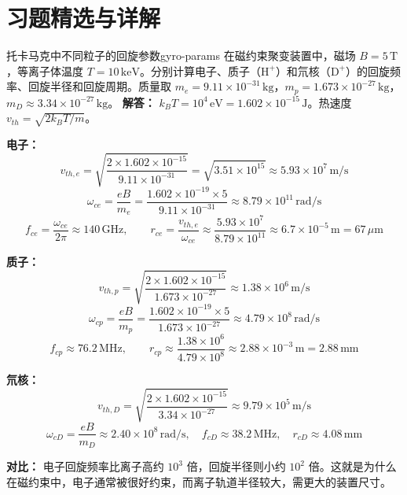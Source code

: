 ﻿%

\section*{习题精选与详解}

\begin{example}{托卡马克中不同粒子的回旋参数}{gyro-params}
在磁约束聚变装置中，磁场 $B=5\,\mathrm{T}$，等离子体温度 $T=10\,\mathrm{keV}$。分别计算电子、质子（$\mathrm{H}^+$）和氘核（$\mathrm{D}^+$）的回旋频率、回旋半径和回旋周期。质量取 $m_e=9.11\times 10^{-31}\,\mathrm{kg}$，$m_p=1.673\times 10^{-27}\,\mathrm{kg}$，$m_D\approx 3.34\times 10^{-27}\,\mathrm{kg}$。
\tcblower
\textbf{解答：}
$k_{\!B}T = 10^4\,\mathrm{eV} = 1.602\times 10^{-15}\,\mathrm{J}$。热速度 $v_{th}=\sqrt{2k_{\!B}T/m}$。

\textbf{电子：}
\[
v_{th,e} = \sqrt{\frac{2\times 1.602\times 10^{-15}}{9.11\times 10^{-31}}} = \sqrt{3.51\times 10^{15}} \approx 5.93\times 10^{7}\,\mathrm{m/s}
\]
\[
\omega_{ce} = \frac{eB}{m_e} = \frac{1.602\times 10^{-19}\times 5}{9.11\times 10^{-31}} \approx 8.79\times 10^{11}\,\mathrm{rad/s}
\]
\[
f_{ce} = \frac{\omega_{ce}}{2\pi} \approx 140\,\mathrm{GHz},\qquad r_{ce} = \frac{v_{th,e}}{\omega_{ce}} \approx \frac{5.93\times 10^{7}}{8.79\times 10^{11}} \approx 6.7\times 10^{-5}\,\mathrm{m} = 67\,\mu\mathrm{m}
\]

\textbf{质子：}
\[
v_{th,p} = \sqrt{\frac{2\times 1.602\times 10^{-15}}{1.673\times 10^{-27}}} \approx 1.38\times 10^{6}\,\mathrm{m/s}
\]
\[
\omega_{cp} = \frac{eB}{m_p} = \frac{1.602\times 10^{-19}\times 5}{1.673\times 10^{-27}} \approx 4.79\times 10^{8}\,\mathrm{rad/s}
\]
\[
f_{cp} \approx 76.2\,\mathrm{MHz},\qquad r_{cp} \approx \frac{1.38\times 10^{6}}{4.79\times 10^{8}} \approx 2.88\times 10^{-3}\,\mathrm{m} = 2.88\,\mathrm{mm}
\]

\textbf{氘核：}
\[
v_{th,D} = \sqrt{\frac{2\times 1.602\times 10^{-15}}{3.34\times 10^{-27}}} \approx 9.79\times 10^{5}\,\mathrm{m/s}
\]
\[
\omega_{cD} = \frac{eB}{m_D} \approx 2.40\times 10^{8}\,\mathrm{rad/s},\quad f_{cD}\approx 38.2\,\mathrm{MHz},\quad r_{cD}\approx 4.08\,\mathrm{mm}
\]

\textbf{对比：} 电子回旋频率比离子高约 $10^3$ 倍，回旋半径则小约 $10^2$ 倍。这就是为什么在磁约束中，电子通常被很好约束，而离子轨道半径较大，需更大的装置尺寸。
\end{example}

